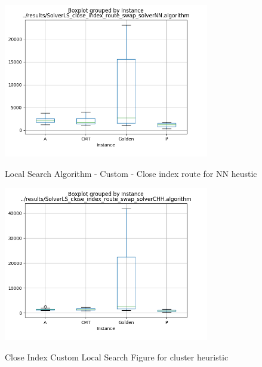 \documentclass[12pt]{article}
\begin{document}
\begin{appendices}
\begin{figure}[!htb]
	\centering
	\caption{Local Search Algorithm - Custom - Close index route for NN heustic}{\includegraphics[width=0.8\textwidth]{SolverLS_close_index_route_swap_solverNN_algorithm_boxplot.png}\label{fig:custom_close_idx_localsearch_boxplot_fig_nn}}
\end{figure}
\begin{figure}[!htb]
	\centering
	\caption{Close Index Custom Local Search Figure for cluster heuristic}{\includegraphics[width=0.8\textwidth]{SolverLS_close_index_route_swap_solverCHH_algorithm_boxplot.png}\label{fig:custom_close_idx_localsearch_boxplot_fig_cluster}}
\end{figure}


\end{appendices}
\end{document}

